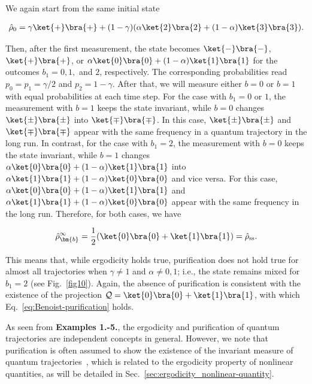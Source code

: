 \documentclass[preprint,pteplogo]{ptephy_v2}%
\numberwithin{equation}{section}
\theoremstyle{definition}
\newcommand{\ml}[1]{\mathcal{#1}}
\newcommand{\mr}[1]{\mathrm{#1}}
\newcommand{\ketbra}[1]{\ket{#1}\bra{#1}}
\newcommand{\aln}[1]{
\begin{align}
#1
\end{align}
}
\begin{document}
We again start from the same initial state
\aln{
\hat{\rho}_0=\gamma\ket{+}\bra{+}+(1-\gamma)(\alpha\ket{2}\bra{2}+(1-\alpha)\ket{3}\bra{3}).
}
Then, after the first measurement, the state becomes $\ketbra{-}$, $\ketbra{+}$, or ${\alpha\ketbra{0}+(1-\alpha)\ketbra{1}}$ for the outcomes $b_1=0,1,$ and $2$, respectively.
The corresponding probabilities read $p_0=p_1=\gamma/2$ and $p_2=1-\gamma$.
After that, we will measure either $b=0$ or $b=1$ with equal probabilities at each time step.
For the case with $b_1=0$ or $1$, the measurement with $b=1$ keeps the state invariant, while $b=0$ changes $\ketbra{\pm}$ into $\ketbra{\mp}$.
In this case, $\ketbra{\pm}$ and $\ketbra{\mp}$ appear with the same frequency in a quantum trajectory in the long run.
In contrast, for the case with $b_1=2$, the measurement with $b=0$ keeps the state invariant, while $b=1$ changes $\alpha\ketbra{0}+(1-\alpha)\ketbra{1}$ into $\alpha\ketbra{1}+(1-\alpha)\ketbra{0}$ and vice versa.
For this case, $\alpha\ketbra{0}+(1-\alpha)\ketbra{1}$ and $\alpha\ketbra{1}+(1-\alpha)\ketbra{0}$ appear with the same frequency in the long run.
Therefore, for both cases, we have
\aln{
\hat{\rho}_{\bm{b}}^\infty=\frac{1}{2}(\ketbra{0}+\ketbra{1})=\hat{\rho}_\mr{ss}.
}

This means that, while ergodicity holds true, purification does not hold true for almost all trajectories when $\gamma\neq 1$ and $\alpha\neq 0,1$; i.e., the state remains mixed for $b_1=2$ (see Fig.~\ref{fig10}). 
Again, the absence of purification is consistent with the existence of the projection $\ml{Q}=\ketbra{0}+\ketbra{1}$, with which Eq.~\eqref{eq:Benoist-purification} holds.

As seen from \textbf{Examples 1.-5.}, the ergodicity and purification of quantum trajectories are independent concepts in general.
However, we note that purification is often assumed to show the existence of the invariant measure of quantum trajectories~\cite{benoist2019invariant}, which is related to the ergodicity property of nonlinear quantities, as will be detailed in Sec.~\ref{sec:ergodicity_nonlinear-quantity}.
\end{document}
